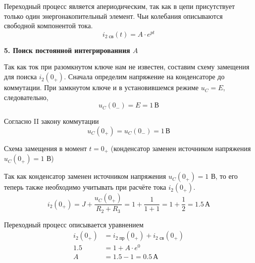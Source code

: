 \documentclass[12pt]{article}
\begin{document}
Переходный процесс является апериодическим, так как в цепи присутствует только один энергонакопительный элемент. Чьи колебания описываются свободной компонентой тока.
\[
i_{2\text{ св}}(t) = A \cdot e^{pt}
\]

\textbf{5. Поиск постоянной интегрированния $A$}

Так как ток при разомкнутом ключе нам не известен, составим схему замещения для поиска $i_2(0_+)$.
Сначала определим напряжение на конденсаторе до коммутации. При замкнутом ключе и в установившемся режиме $u_C = E$, следовательно,
\[
u_C(0_-) = E = 1\,\text{В}
\]

Согласно II закону коммутации
\[
u_C(0_+) = u_C(0_-) = 1\,\text{В}
\]

Схема замещения в момент $t = 0_+$ (конденсатор заменен источником напряжения $u_C(0_+) = 1$ В)
\begin{center}
\end{center}

Так как конденсатор заменен источником напряжения $u_C(0_+) = 1$ В, то его теперь также необходимо учитывать при расчёте тока $i_2(0_+)$.
\[
i_2(0_+) = J + \frac{u_C(0_+)}{R_2 + R_3} = 1 + \frac{1}{1 + 1} = 1 + \frac{1}{2} = 1.5\,\text{А}
\]

Переходный процесс описывается уравнением
\[
\begin{aligned}
i_2(0_+) &= i_{2\text{ пр}}(0_+) + i_{2\text{ св}}(0_+) \\
1.5 &= 1 + A \cdot e^{0} \\
A &= 1.5 - 1 = 0.5\,\text{А}
\end{aligned}
\]
\end{document}
